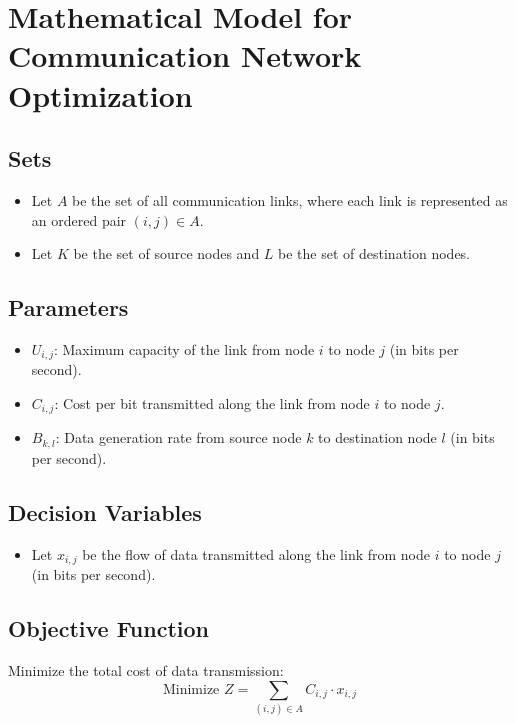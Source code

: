 \documentclass{article}
\begin{document}
\section*{Mathematical Model for Communication Network Optimization}

\subsection*{Sets}
\begin{itemize}
    \item Let \( A \) be the set of all communication links, where each link is represented as an ordered pair \( (i, j) \in A \).
    \item Let \( K \) be the set of source nodes and \( L \) be the set of destination nodes.
\end{itemize}

\subsection*{Parameters}
\begin{itemize}
    \item \( U_{i,j} \): Maximum capacity of the link from node \( i \) to node \( j \) (in bits per second).
    \item \( C_{i,j} \): Cost per bit transmitted along the link from node \( i \) to node \( j \).
    \item \( B_{k,l} \): Data generation rate from source node \( k \) to destination node \( l \) (in bits per second).
\end{itemize}

\subsection*{Decision Variables}
\begin{itemize}
    \item Let \( x_{i,j} \) be the flow of data transmitted along the link from node \( i \) to node \( j \) (in bits per second).
\end{itemize}

\subsection*{Objective Function}
Minimize the total cost of data transmission:
\[
\text{Minimize } Z = \sum_{(i,j) \in A} C_{i,j} \cdot x_{i,j}
\]
\end{document}
